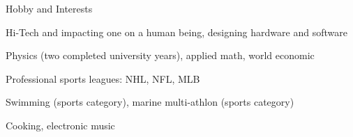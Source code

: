 \documentclass{template}
\begin{document}
\begin{rSection}{Hobby and Interests}

\begin{rHobby}
\item Hi-Tech and impacting one on a human being, designing hardware and software
\item Physics (two completed university years), applied math, world economic
\item Professional sports leagues: NHL, NFL, MLB
\item Swimming (sports category), marine multi-athlon (sports category)
\item Cooking, electronic music
\end{rHobby}

\end{rSection}

\end{document}
